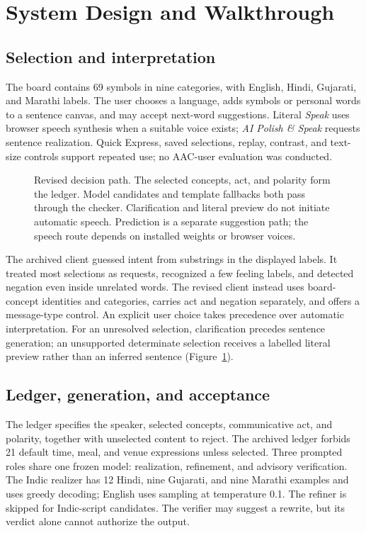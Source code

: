 \section{System Design and Walkthrough}
\label{sec:system}
\subsection{Selection and interpretation}
The board contains 69 symbols in nine categories, with English, Hindi, Gujarati, and Marathi labels.
The user chooses a language, adds symbols or personal words to a sentence canvas, and may accept next-word suggestions.
Literal \emph{Speak} uses browser speech synthesis when a suitable voice exists; \emph{AI Polish \& Speak} requests sentence realization.
Quick Express, saved selections, replay, contrast, and text-size controls support repeated use; no AAC-user evaluation was conducted.

\begin{figure}[t]
\centering

\caption{Revised decision path. The selected concepts, act, and polarity form the ledger. Model candidates and template fallbacks both pass through the checker. Clarification and literal preview do not initiate automatic speech. Prediction is a separate suggestion path; the speech route depends on installed weights or browser voices.}
\label{fig:arch}
\end{figure}

The archived client guessed intent from substrings in the displayed labels.
It treated most selections as requests, recognized a few feeling labels, and detected negation even inside unrelated words.
The revised client instead uses board-concept identities and categories, carries act and negation separately, and offers a message-type control.
An explicit user choice takes precedence over automatic interpretation.
For an unresolved selection, clarification precedes sentence generation; an unsupported determinate selection receives a labelled literal preview rather than an inferred sentence (Figure~\ref{fig:arch}).

\subsection{Ledger, generation, and acceptance}
The ledger specifies the speaker, selected concepts, communicative act, and polarity, together with unselected content to reject.
The archived ledger forbids 21 default time, meal, and venue expressions unless selected.
Three prompted roles share one frozen \model{} model: realization, refinement, and advisory verification.
The Indic realizer has 12 Hindi, nine Gujarati, and nine Marathi examples and uses greedy decoding; English uses sampling at temperature 0.1.
The refiner is skipped for Indic-script candidates.
The verifier may suggest a rewrite, but its verdict alone cannot authorize the output.

